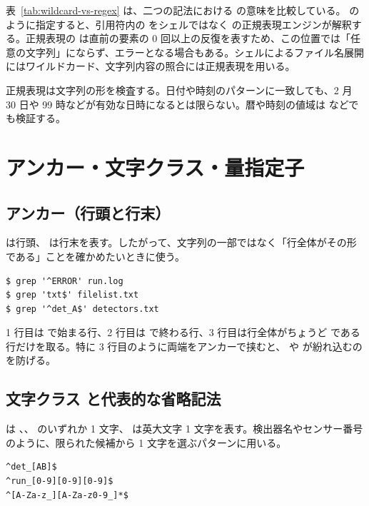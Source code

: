 表~\ref{tab:wildcard-vs-regex} は、二つの記法における \code{*} の意味を比較している。 のように指定すると、引用符内の \code{*} をシェルではなく  の正規表現エンジンが解釈する。正規表現の \code{*} は直前の要素の 0 回以上の反復を表すため、この位置では「任意の文字列」にならず、エラーとなる場合もある。シェルによるファイル名展開にはワイルドカード、文字列内容の照合には正規表現を用いる。

正規表現は文字列の形を検査する。日付や時刻のパターンに一致しても、2 月 30 日や 99 時などが有効な日時になるとは限らない。暦や時刻の値域は  などでも検証する。

\section{アンカー・文字クラス・量指定子}

\subsection{アンカー（行頭と行末）}

\code{\textasciicircum} は行頭、\code{\$} は行末を表す。したがって、文字列の一部ではなく「行全体がその形である」ことを確かめたいときに使う。

\begin{lstlisting}[numbers=none, xleftmargin=2\zw]
$ grep '^ERROR' run.log
$ grep 'txt$' filelist.txt
$ grep '^det_A$' detectors.txt
\end{lstlisting}

1 行目は  で始まる行、2 行目は  で終わる行、3 行目は行全体がちょうど  である行だけを取る。特に 3 行目のように両端をアンカーで挟むと、 や  が紛れ込むのを防げる。

\subsection{文字クラス \code{[...]} と代表的な省略記法}

\code{[abc]} は 、、 のいずれか 1 文字、\code{[A-Z]} は英大文字 1 文字を表す。検出器名やセンサー番号のように、限られた候補から 1 文字を選ぶパターンに用いる。

\begin{lstlisting}[numbers=none, xleftmargin=2\zw]
^det_[AB]$
^run_[0-9][0-9][0-9]$
^[A-Za-z_][A-Za-z0-9_]*$
\end{lstlisting}

